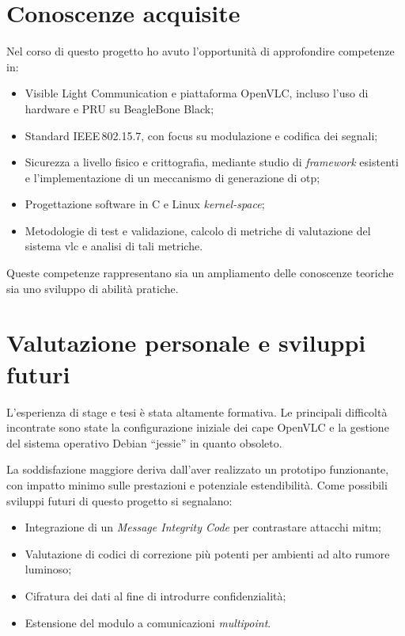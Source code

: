 \section{Conoscenze acquisite}
Nel corso di questo progetto ho avuto l'opportunità di approfondire competenze in:
\begin{itemize}
  \item Visible Light Communication e piattaforma OpenVLC, incluso l'uso di hardware e PRU su BeagleBone Black;
  \item Standard IEEE\,802.15.7, con focus su modulazione e codifica dei segnali;
  \item Sicurezza a livello fisico e crittografia, mediante studio di \textit{framework} esistenti e l'implementazione di un meccanismo di generazione di \gls{otp};
  \item Progettazione software in C e Linux \textit{kernel-space};
  \item Metodologie di test e validazione, calcolo di metriche di valutazione del sistema \gls{vlc} e analisi di tali metriche.
\end{itemize}
Queste competenze rappresentano sia un ampliamento delle conoscenze teoriche sia uno sviluppo di abilità pratiche.

\section{Valutazione personale e sviluppi futuri}
L'esperienza di stage e tesi è stata altamente formativa. Le principali difficoltà incontrate sono state la configurazione iniziale dei cape OpenVLC e la gestione del sistema operativo Debian “jessie” in quanto obsoleto.

La soddisfazione maggiore deriva dall'aver realizzato un prototipo funzionante, con impatto minimo sulle prestazioni e potenziale estendibilità. Come possibili sviluppi futuri di questo progetto si segnalano:
\begin{itemize}
  \item Integrazione di un \textit{Message Integrity Code} per contrastare attacchi \gls{mitm};
  \item Valutazione di codici di correzione più potenti per ambienti ad alto rumore luminoso;
  \item Cifratura dei dati al fine di introdurre confidenzialità;
  \item Estensione del modulo a comunicazioni \textit{multipoint}.
\end{itemize}